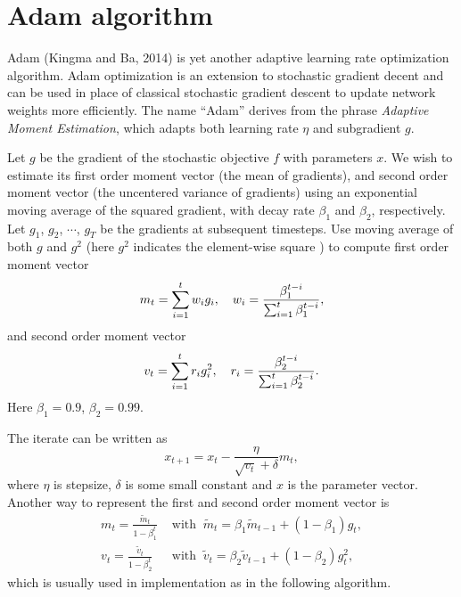 \section{Adam algorithm}
Adam (Kingma and Ba, 2014) is yet another adaptive learning rate optimization algorithm. Adam optimization is an extension to stochastic gradient decent and can be used in place of classical stochastic gradient descent to update network weights more efficiently. The name ``Adam'' derives from the phrase \emph{Adaptive Moment Estimation}, which adapts both learning rate $\eta$ and subgradient $g$.



Let $g$ be the gradient of the stochastic objective $f$ with parameters $x$. We wish to estimate its  first order moment vector (the mean of gradients), and second order moment vector (the uncentered variance of gradients)  using an exponential moving average of the squared gradient, with decay rate $\beta_1$ and $\beta_2$, respectively. Let $g_1$, $g_2$, $\cdots$, $g_T$ be the gradients at subsequent timesteps. 
Use moving average of both $g$ and $g^2$ (here $g^2$ indicates the element-wise square%
) to compute first order moment vector  
\begin{equation}
m_t  =\sum_{i=1}^{t} w_i g_i,\quad w_i={\beta_1^{t-i} \over \sum_{i=1}^t\beta_1^{t-i}},
\end{equation}
and second order moment vector  
\begin{equation}
v_t  =\sum_{i=1}^{t}r_i g^2_i,\quad r_i={\beta_2^{t-i} \over \sum_{i=1}^t\beta_2^{t-i}}.
\end{equation}
Here $\beta_1 = 0.9$, $\beta_2 = 0.99$.

The iterate can be written as 
\begin{equation}\label{Adam}
x_{t+1}=x_t-\frac{\eta}{\sqrt{v_t}+\delta} m_t,
\end{equation}
where $\eta$ is stepsize, $\delta$ is some small constant and $x$ is the parameter vector. Another way to represent the first and second order moment vector  is 
\begin{align}
m_t=\frac{\tilde m_t}{1-\beta_1^t} &\mbox{ with }\ \tilde m_t  =\beta_1 \tilde m_{t-1} + (1-\beta_1) g_t,\\
v_t=\frac{\tilde v_t}{1-\beta_2^t}&\mbox{ with }\ \tilde v_t  =\beta_2 \tilde v_{t-1} + (1-\beta_2) g_t^2,	
\end{align}
which is usually used in implementation as in the following algorithm.

